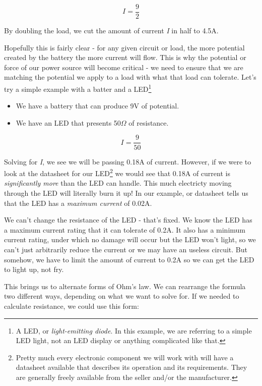\begin{equation}
I = \frac{9}{2}
\end{equation}

By doubling the load, we cut the amount of current \textit{I} in half to 4.5A. 

Hopefully this is fairly clear - for any given circuit or load, the more potential created by the battery the more current will flow. This is why the potential or force of our power source will become critical - we need to ensure that we are matching the potential we apply to a load with what that load can tolerate. Let's try a simple example with a batter and a LED\footnote{A LED, or \textit{light-emitting diode}. In this example, we are referring to a simple LED light, not an LED display or anything complicated like that.}

\begin{itemize}
\item We have a battery that can produce 9V of potential.
\item We have an LED that presents 50$\Omega$ of resistance.
\end{itemize}

\begin{equation}
I = \frac{9}{50}
\end{equation}

Solving for \textit{I}, we see we will be passing 0.18A of current. However, if we were to look at the datasheet for our LED\footnote{Pretty much every electronic component we will work with will have a datasheet available that describes its operation and its requirements. They are generally freely available from the seller and/or the manufacturer.} we would see that 0.18A of current is \textit{significantly more} than the LED can handle. This much electricty moving through the LED will literally burn it up! In our example, or datasheet tells us that the LED has a \textit{maximum current} of 0.02A. 

We can't change the resistance of the LED - that's fixed. We know the LED has a maximum current rating that it can tolerate of 0.2A. It also has a minimum current rating, under which no damage will occur but the LED won't light, so we can't just arbitrarily reduce the current or we may have an useless circuit. But somehow, we have to limit the amount of current to 0.2A so we can get the LED to light up, not fry.

This brings us to alternate forms of Ohm's law. We can rearrange the formula two different ways, depending on what we want to solve for. If we needed to calculate resistance, we could use this form:

